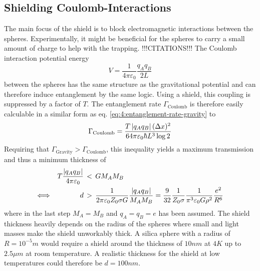 \subsection{Shielding Coulomb-Interactions}
The main focus of the shield is to block electromagnetic interactions between the spheres.
Experimentally, it might be beneficial for the spheres to carry a small amount of charge to help with the trapping. !!!CITATIONS!!!
The Coulomb interaction potential energy
\begin{equation}
  V = \frac{1}{4\pi\varepsilon_0} \frac{q_A q_B}{2L}
\end{equation}
between the spheres has the same structure as the gravitational potential and can therefore induce entanglement by the same logic.
Using a shield, this coupling is suppressed by a factor of $T$.
The entanglement rate $\Gamma_\mathrm{Coulomb}$ is therefore easily calculable in a similar form as eq. \eqref{eq:4:entanglement-rate-gravity} to
\begin{equation}\label{eq:4:entanglement-rate-coulomb}
  \Gamma_\mathrm{Coulomb} = \frac{T \left\lvert q_A q_B\right\rvert (\Delta x)^2}{64 \pi \varepsilon_0 \hbar L^3 \log 2}
\end{equation}
Requiring that $\Gamma_\mathrm{Gravity} > \Gamma_\mathrm{Coulomb}$, this inequality yields a maximum transmission and thus a minimum thickness of
\begin{align}\label{eq:4:coulomb-gravity-condition}
  T \frac{\left\lvert q_A q_B\right\rvert}{4 \pi \varepsilon_0} \, &< \, G M_A M_B \\
  \Longleftrightarrow \quad\quad\quad\quad d \, &> \, \frac{1}{2 \pi \varepsilon_0 Z_0 \sigma G} \frac{\left\lvert q_A q_B\right\rvert}{M_A M_B} = \frac{9}{32}\frac{1}{Z_0 \sigma} \frac{1}{\pi^3 \varepsilon_0 G \rho^2} \frac{e^2}{R^6}
\end{align}
where in the last step $M_A = M_B$ and $q_A = q_B = e$ has been assumed.
The shield thickness heavily depends on the radius of the spheres where small and light masses make the shield unworkably thick.
A silica sphere with a radius of $R=10^{-5}\si{m}$ would require a shield around the thickness of $10\si{nm}$ at $4\si{K}$ up to $2.5\si{\mu m}$ at room temperature.
A realistic thickness for the shield at low temperatures could therefore be $d=100\si{nm}$.

